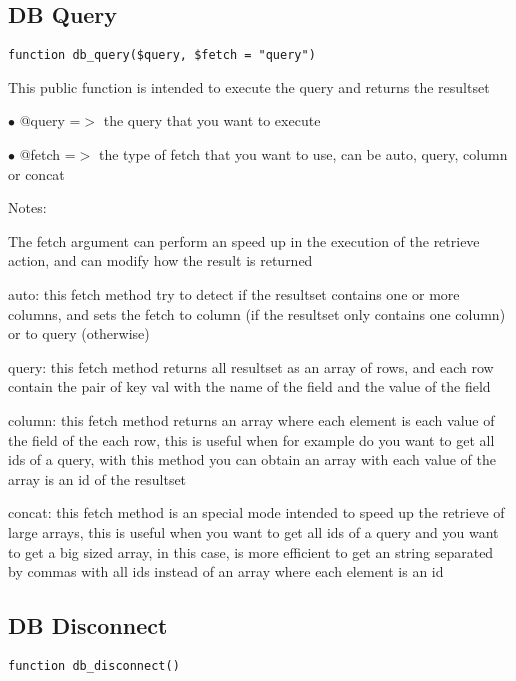 \documentclass[a4paper]{book}
\begin{document}
\hypertarget{toc60}{}
\subsection{DB Query}

\begin{lstlisting}
function db_query($query, $fetch = "query")
\end{lstlisting}

This public function is intended to execute the query and returns the resultset

\begin{compactitem}
\item[\color{myblue}$\bullet$] @query =$>$ the query that you want to execute
\item[\color{myblue}$\bullet$] @fetch =$>$ the type of fetch that you want to use, can be auto, query, column or concat
\end{compactitem}

Notes:

The fetch argument can perform an speed up in the execution of the retrieve action, and
can modify how the result is returned

auto: this fetch method try to detect if the resultset contains one or more columns, and
sets the fetch to column (if the resultset only contains one column) or to query (otherwise)

query: this fetch method returns all resultset as an array of rows, and each row contain the
pair of key val with the name of the field and the value of the field

column: this fetch method returns an array where each element is each value of the field of
the each row, this is useful when for example do you want to get all ids of a query, with
this method you can obtain an array with each value of the array is an id of the resultset

concat: this fetch method is an special mode intended to speed up the retrieve of large
arrays, this is useful when you want to get all ids of a query and you want to get a big
sized array, in this case, is more efficient to get an string separated by commas with all
ids instead of an array where each element is an id

\hypertarget{toc61}{}
\subsection{DB Disconnect}

\begin{lstlisting}
function db_disconnect()
\end{lstlisting}
\end{document}
